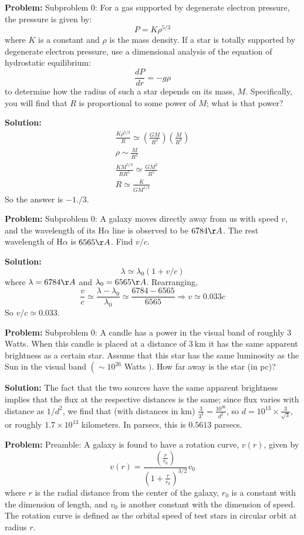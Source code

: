 \documentclass[10pt]{article}
\begin{document}
\textbf{Problem:}
Subproblem 0: For a gas supported by degenerate electron pressure, the pressure is given by:
\[
P=K \rho^{5 / 3}
\]
where $K$ is a constant and $\rho$ is the mass density. If a star is totally supported by degenerate electron pressure, use a dimensional analysis of the equation of hydrostatic equilibrium:
\[
\frac{d P}{d r}=-g \rho
\]
to determine how the radius of such a star depends on its mass, $M$.  Specifically, you will find that $R$ is proportional to some power of $M$; what is that power?


\textbf{Solution:}
\[
\begin{gathered}
\frac{K \rho^{5 / 3}}{R} \simeq\left(\frac{G M}{R^{2}}\right)\left(\frac{M}{R^{3}}\right) \\
\rho \sim \frac{M}{R^{3}} \\
\frac{K M^{5 / 3}}{R R^{5}} \simeq \frac{G M^{2}}{R^{5}} \\
R \simeq \frac{K}{G M^{1 / 3}}
\end{gathered}
\]
So the answer is $\boxed{-1./3}$.


\textbf{Problem:}
Subproblem 0: A galaxy moves directly away from us with speed $v$, and the wavelength of its $\mathrm{H} \alpha$ line is observed to be $6784 \AA$. The rest wavelength of $\mathrm{H} \alpha$ is $6565 \AA$. Find $v/c$.


\textbf{Solution:}
\[
\lambda \simeq \lambda_{0}(1+v / c)
\]
where $\lambda=6784 \AA$ and $\lambda_{0}=6565 \AA$. Rearranging,
\[
\frac{v}{c} \simeq \frac{\lambda-\lambda_{0}}{\lambda_{0}} \simeq \frac{6784-6565}{6565} \Rightarrow v \simeq 0.033 c
\]
So $v/c \simeq \boxed{0.033}$.


\textbf{Problem:}
Subproblem 0: A candle has a power in the visual band of roughly $3$ Watts. When this candle is placed at a distance of $3 \mathrm{~km}$ it has the same apparent brightness as a certain star. Assume that this star has the same luminosity as the Sun in the visual band $\left(\sim 10^{26}\right.$ Watts $)$. How far away is the star (in pc)?


\textbf{Solution:}
The fact that the two sources have the same apparent brightness implies that the flux at the respective distances is the same; since flux varies with distance as $1/d^2$, we find that (with distances in km) $\frac{3}{3^2} = \frac{10^{26}}{d^2}$, so $d = 10^{13}\times\frac{3}{\sqrt{3}}$, or roughly $1.7\times 10^{13}$ kilometers.  In parsecs, this is $\boxed{0.5613}$ parsecs.


\textbf{Problem:}
Preamble: A galaxy is found to have a rotation curve, $v(r)$, given by
\[
v(r)=\frac{\left(\frac{r}{r_{0}}\right)}{\left(1+\frac{r}{r_{0}}\right)^{3 / 2}} v_{0}
\]
where $r$ is the radial distance from the center of the galaxy, $r_{0}$ is a constant with the dimension of length, and $v_{0}$ is another constant with the dimension of speed. The rotation curve is defined as the orbital speed of test stars in circular orbit at radius $r$.
\end{document}
